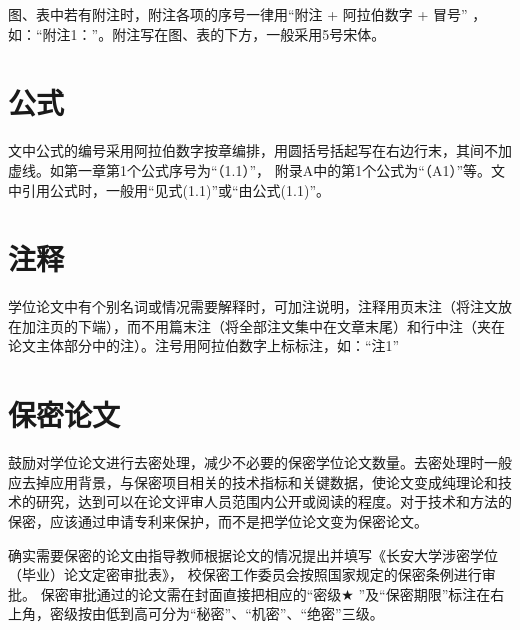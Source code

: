 图、表中若有附注时，附注各项的序号一律用“附注 + 阿拉伯数字 + 冒号” ，如：“附注1：”。附注写在图、表的下方，一般采用5号宋体。

\section{公式}

文中公式的编号采用阿拉伯数字按章编排，用圆括号括起写在右边行末，其间不加虚线。如第一章第1个公式序号为“（1.1）”， 附录A中的第1个公式为“（A1）”等。文中引用公式时，一般用“见式(1.1)”或“由公式(1.1)”。

\section{注释}

学位论文中有个别名词或情况需要解释时，可加注说明，注释用页末注（将注文放在加注页的下端），而不用篇末注（将全部注文集中在文章末尾）和行中注（夹在论文主体部分中的注）。注号用阿拉伯数字上标标注，如：“注1”

\section{保密论文}

鼓励对学位论文进行去密处理，减少不必要的保密学位论文数量。去密处理时一般应去掉应用背景，与保密项目相关的技术指标和关键数据，使论文变成纯理论和技术的研究，达到可以在论文评审人员范围内公开或阅读的程度。对于技术和方法的保密，应该通过申请专利来保护，而不是把学位论文变为保密论文。

确实需要保密的论文由指导教师根据论文的情况提出并填写《长安大学涉密学位（毕业）论文定密审批表》，
校保密工作委员会按照国家规定的保密条例进行审批。
保密审批通过的论文需在封面直接把相应的“密级$\bigstar$  %
”及“保密期限”标注在右上角，密级按由低到高可分为“秘密”、“机密”、“绝密”三级。
